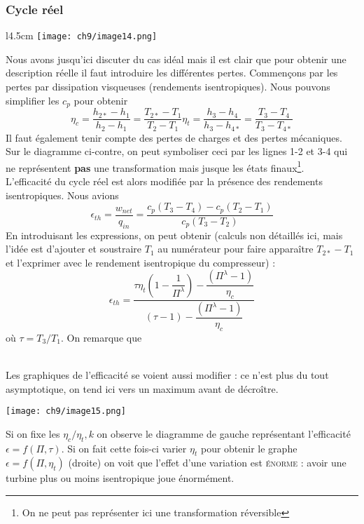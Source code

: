 		\subsubsection{Cycle réel}
							\begin{wrapfigure}[11]{l}{4.5cm}
					\vspace{-5mm}
	\texttt{[image: ch9/image14.png]}
		\end{wrapfigure}
		Nous avons jusqu'ici discuter du cas idéal mais il est clair que pour obtenir une 
		description réelle il faut introduire les différentes pertes. Commençons par les 
		pertes par dissipation visqueuses (rendements isentropiques). Nous pouvons simplifier 
		les $c_p$ pour obtenir
		\begin{equation}
		\eta_c = \dfrac{h_{2*}-h_1}{h_2-h_1}=\dfrac{T_{2*}-T_1}{T_2-T_1}
		\eta_t = \dfrac{h_3-h_4}{h_3-h_{4*}} =\dfrac{T_3-T_4}{T_3-T_{4*}}
		\end{equation}
		Il faut également tenir compte des pertes de charges et des pertes mécaniques. Sur 
		le diagramme ci-contre, on peut symboliser ceci par les lignes 1-2 et 3-4 qui ne 
		représentent \textbf{pas} une transformation mais jusque les états finaux\footnote{On 
		ne peut pas représenter ici une transformation réversible}.\\
		
		L'efficacité du cycle réel est alors modifiée par la présence des rendements isentropiques. 
		Nous avions
		\begin{equation}
		\epsilon_{th} = \dfrac{w_{net}}{q_{in}} = \dfrac{c_p(T_3-T_4)-c_p(T_2-T_1)}{c_p(T_3-T_2)}
		\end{equation}
		En introduisant les expressions, on peut obtenir (calculs non détaillés ici, mais l'idée 
		est d'ajouter et soustraire $T_1$ au numérateur pour faire apparaître $T_{2*}-T_1$ et 
		l'exprimer avec le rendement isentropique du compresseur) :
		\begin{equation}
		\epsilon_{th} = \dfrac{\tau\eta_t\left(1-\dfrac{1}{\Pi^\lambda}\right)-\dfrac{\left(
		\Pi^\lambda-1\right)}{\eta_c}}{(\tau-1)-\dfrac{(\Pi^\lambda-1)}{\eta_c}}
		\end{equation}
		où $\tau = T_3/T_1$. On remarque que \\
		
		\
		
		Les graphiques de l'efficacité se voient aussi modifier : ce n'est plus du tout 
		asymptotique, on tend ici vers un maximum avant de décroître.
		\begin{center}
		\texttt{[image: ch9/image15.png]}
		\end{center}
		Si on fixe les $\eta_c/\eta_t, k$ on observe le diagramme de gauche représentant 
		l'efficacité $\epsilon = f(\Pi,\tau)$. Si on fait cette fois-ci varier $\eta_t$ 
		pour obtenir le graphe $\epsilon = f(\Pi,\eta_t)$ (droite) on voit que l'effet d'une 
		variation est \textsc{énorme} : avoir une turbine plus ou moins isentropique 
		joue énormément.
		
